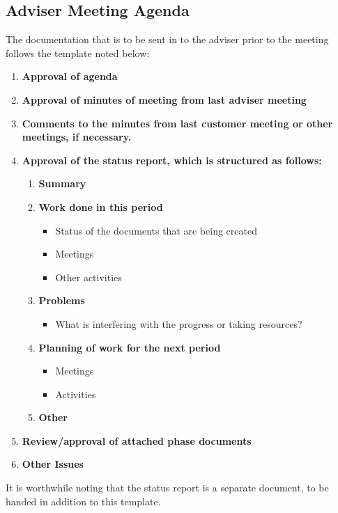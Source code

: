 \documentclass[../document]{subfiles}
\begin{document}
\subsection{Adviser Meeting Agenda}
\label{adviser_meeting_agenda}
The documentation that is to be sent in to the adviser prior to the meeting follows the template noted below:

\begin{enumerate}
	\item
	\textbf{Approval of agenda}
	\item
	\textbf{Approval of minutes of meeting from last adviser meeting}
	\item
	\textbf{Comments to the minutes from last customer meeting or other meetings, if necessary.}
	\item
	\textbf{Approval of the status report, which is structured as follows:}
	\begin{enumerate}[label*=\arabic*.]
		\item
		\textbf{Summary}
		\item
		\textbf{Work done in this period}
		\begin{itemize}
			\item
			Status of the documents that are being created
			\item
			Meetings
			\item
			Other activities
		\end{itemize}
		\item
		\textbf{Problems}
		\begin{itemize}
			\item
			What is interfering with the progress or taking resources?
		\end{itemize}
		\item
		\textbf{Planning of work for the next period}
		\begin{itemize}
			\item
			Meetings
			\item
			Activities
		\end{itemize}
		\item
		\textbf{Other}
	\end{enumerate}
	\item
	\textbf{Review/approval of attached phase documents}
	\item
	\textbf{Other Issues}
\end{enumerate}

It is worthwhile noting that the status report is a separate document, to be handed in addition to this template.
\end{document}
